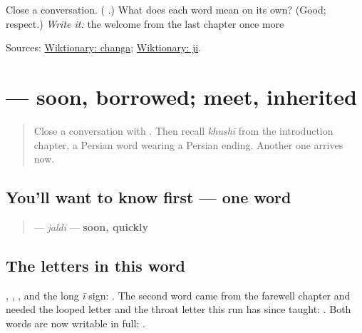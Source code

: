 \begin{tcolorbox}[breakable,colback=teal!4,colframe=teal!35!black,title={Before you move on}]
Close a conversation. (\textbf{ }.) What does each word mean on its own? (Good; respect.) \emph{Write it:} the welcome from the last chapter once more

Sources: \href{https://en.wiktionary.org/wiki/\%E0\%A8\%9A\%E0\%A9\%B0\%E0\%A8\%97\%E0\%A8\%BE}{Wiktionary: changa}; \href{https://en.wiktionary.org/wiki/\%E0\%A8\%9C\%E0\%A9\%80}{Wiktionary: ji}.
\end{tcolorbox}
\section[\texorpdfstring{\pa{ਜਲਦੀ} \pa{ਮਿਲਾਂਗੇ} (jaldī milāṁge)}{ਜਲਦੀ ਮਿਲਾਂਗੇ (jaldī milāṁge)}]{  — soon, borrowed; meet, inherited}

\label{lesson:PA-C35-jaldi-milaange}



\begin{quote}
Close a conversation with \textbf{ }. Then recall \emph{khushī} from the introduction chapter, a Persian word wearing a Persian ending. Another one arrives now.
\end{quote}

\subsection*{You'll want to know first — one word}
\begin{quote}
\textbf{} — \emph{jaldī} — \textbf{soon, quickly}
\end{quote}

\subsection*{The letters in this word}
\textbf{}, \textbf{}, \textbf{}, and the long \emph{ī} sign: \textbf{}. The second word came from the farewell chapter and needed the looped letter and the throat letter this run has since taught: \textbf{}. Both words are now writable in full: \textbf{ }.


